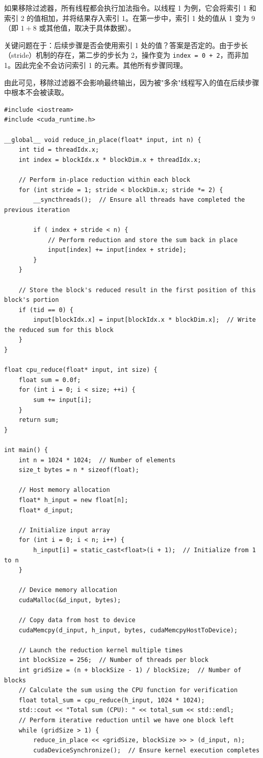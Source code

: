 如果移除过滤器，所有线程都会执行加法指令。以线程 1 为例，它会将索引 1 和索引 2 的值相加，并将结果存入索引 1。在第一步中，索引 1 处的值从 1 变为 9（即 $1+8$ 或其他值，取决于具体数据）。

关键问题在于：后续步骤是否会使用索引 1 处的值？答案是否定的。由于步长（stride）机制的存在，第二步的步长为 2，操作变为 \texttt{index = 0 + 2}，而非加 1。因此完全不会访问索引 1 的元素。其他所有步骤同理。

由此可见，移除过滤器不会影响最终输出，因为被"多余"线程写入的值在后续步骤中根本不会被读取。

\begin{lstlisting}
#include <iostream>
#include <cuda_runtime.h>

__global__ void reduce_in_place(float* input, int n) {
    int tid = threadIdx.x;
    int index = blockIdx.x * blockDim.x + threadIdx.x;

    // Perform in-place reduction within each block
    for (int stride = 1; stride < blockDim.x; stride *= 2) {
        __syncthreads();  // Ensure all threads have completed the previous iteration

        if ( index + stride < n) {
            // Perform reduction and store the sum back in place
            input[index] += input[index + stride];
        }
    }

    // Store the block's reduced result in the first position of this block's portion
    if (tid == 0) {
        input[blockIdx.x] = input[blockIdx.x * blockDim.x];  // Write the reduced sum for this block
    }
}

float cpu_reduce(float* input, int size) {
    float sum = 0.0f;
    for (int i = 0; i < size; ++i) {
        sum += input[i];
    }
    return sum;
}

int main() {
    int n = 1024 * 1024;  // Number of elements
    size_t bytes = n * sizeof(float);

    // Host memory allocation
    float* h_input = new float[n];
    float* d_input;

    // Initialize input array
    for (int i = 0; i < n; i++) {
        h_input[i] = static_cast<float>(i + 1);  // Initialize from 1 to n
    }

    // Device memory allocation
    cudaMalloc(&d_input, bytes);

    // Copy data from host to device
    cudaMemcpy(d_input, h_input, bytes, cudaMemcpyHostToDevice);

    // Launch the reduction kernel multiple times
    int blockSize = 256;  // Number of threads per block
    int gridSize = (n + blockSize - 1) / blockSize;  // Number of blocks
    // Calculate the sum using the CPU function for verification
    float total_sum = cpu_reduce(h_input, 1024 * 1024);
    std::cout << "Total sum (CPU): " << total_sum << std::endl;
    // Perform iterative reduction until we have one block left
    while (gridSize > 1) {
        reduce_in_place << <gridSize, blockSize >> > (d_input, n);
        cudaDeviceSynchronize();  // Ensure kernel execution completes


\end{lstlisting}
